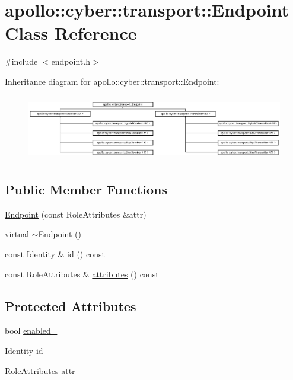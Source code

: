 \hypertarget{classapollo_1_1cyber_1_1transport_1_1Endpoint}{\section{apollo\-:\-:cyber\-:\-:transport\-:\-:Endpoint Class Reference}
\label{classapollo_1_1cyber_1_1transport_1_1Endpoint}
}


{\ttfamily \#include $<$endpoint.\-h$>$}

Inheritance diagram for apollo\-:\-:cyber\-:\-:transport\-:\-:Endpoint\-:\begin{figure}[H]
\begin{center}
\leavevmode
\includegraphics[height=2.896552cm]{classapollo_1_1cyber_1_1transport_1_1Endpoint}
\end{center}
\end{figure}
\subsection*{Public Member Functions}
\begin{DoxyCompactItemize}
\item 
\hyperlink{classapollo_1_1cyber_1_1transport_1_1Endpoint_a9ac289b2b1952934f326ab80bc63beb2}{Endpoint} (const Role\-Attributes \&attr)
\item 
virtual \hyperlink{classapollo_1_1cyber_1_1transport_1_1Endpoint_ace4552dd897f8ec3a8276529061c2ca4}{$\sim$\-Endpoint} ()
\item 
const \hyperlink{classapollo_1_1cyber_1_1transport_1_1Identity}{Identity} \& \hyperlink{classapollo_1_1cyber_1_1transport_1_1Endpoint_aa362f1ca16c50755e20e6f59362a37fc}{id} () const 
\item 
const Role\-Attributes \& \hyperlink{classapollo_1_1cyber_1_1transport_1_1Endpoint_a618711f01e375eab74b46845b193fa77}{attributes} () const 
\end{DoxyCompactItemize}
\subsection*{Protected Attributes}
\begin{DoxyCompactItemize}
\item 
bool \hyperlink{classapollo_1_1cyber_1_1transport_1_1Endpoint_a018bd12d292d6f46e97bb34d3054d5d2}{enabled\-\_\-}
\item 
\hyperlink{classapollo_1_1cyber_1_1transport_1_1Identity}{Identity} \hyperlink{classapollo_1_1cyber_1_1transport_1_1Endpoint_ab13e5b3e9b7b614f687159ad7ff07655}{id\-\_\-}
\item 
Role\-Attributes \hyperlink{classapollo_1_1cyber_1_1transport_1_1Endpoint_ae5eef9d783a55addf75c73f3b2d3d922}{attr\-\_\-}
\end{DoxyCompactItemize}


